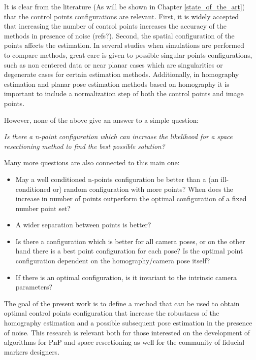 \documentclass[letterpaper, 10 pt, conference]{ieeeconf}  %
\begin{document}
It is clear from the literature (As will be shown in Chapter \ref{state_of_the_art}) that the control points configurations are relevant. First, it is widely accepted that increasing the number of control points increases the accuracy of the methods in presence of noise (refs?). Second, the spatial configuration of the points affects the estimation. In several studies when simulations are performed to compare methods, great care is given to possible singular points configurations, such as non centered data or near planar cases which are singularities or degenerate cases for certain estimation methods. Additionally, in homography estimation and planar pose estimation methods based on homography it is important to include a normalization step of both the control points and image points. 

However, none of the above give an answer to a simple question: 

\textit{Is there a n-point configuration which can increase the likelihood for a space resectioning method to find the best possible solution?}

Many more questions are also connected to this main one:

\begin{itemize}
\item May a well conditioned n-points configuration be better than a (an ill-conditioned or) random configuration with more points? When does the increase in number of points outperform the optimal configuration of a fixed number point set? 
\item A wider separation between points is better?
\item Is there a configuration which is better for all camera poses, or on the other hand there is a best point configuration for each pose? Is the optimal point configuration dependent on the homography/camera pose itself?
\item If there is an optimal configuration, is it invariant to the intrinsic camera parameters?
\end{itemize}

The goal of the present work is to define a method that can be used to obtain optimal control points configuration that increase the robustness of the homography estimation and a possible subsequent pose estimation in the presence of noise. This research is relevant both for those interested on the development of algorithms for PnP and space resectioning as well for the community of fiducial markers designers.
\end{document}
